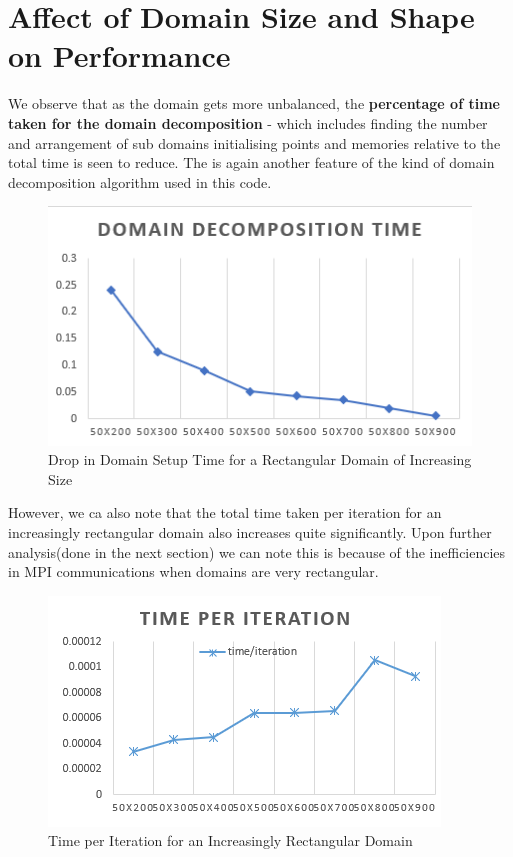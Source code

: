 \documentclass[twoside,twocolumn]{article}
\begin{document}
\section{Affect of Domain Size and Shape on Performance}

We observe that as the domain gets more unbalanced, the \textbf{percentage of time taken for the domain decomposition} - which includes finding the number and arrangement of sub domains initialising points and memories relative to the total time is seen to reduce. The is again another feature of the kind of domain decomposition algorithm used in this code.
\vspace{-4mm}
\begin{figure}[H]
\centering
\includegraphics[height=5.5 cm\textwidth]{images/domdecomtime.png}
\caption{Drop in Domain Setup Time for a Rectangular Domain of Increasing Size}
\end{figure}
However, we ca also note that the total time taken per iteration for an increasingly rectangular domain also increases quite significantly. Upon further analysis(done in the next section) we can note this is because of the inefficiencies in MPI communications when domains are very rectangular.
\vspace{-4mm}
\begin{figure}[H]
\centering
\includegraphics[height=5.5 cm\textwidth]{images/timeperiteration.png}
\caption{Time per Iteration for an Increasingly Rectangular Domain}
\end{figure}
\end{document}
